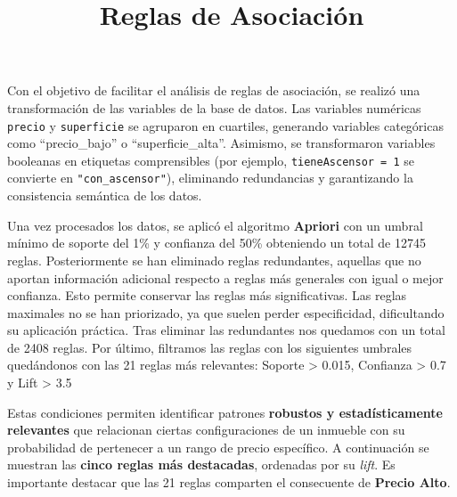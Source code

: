 \documentclass[
]{article}
\title{Reglas de Asociación}
\author{}
\date{\vspace{-2.5em}}
\begin{document}
\maketitle

Con el objetivo de facilitar el análisis de reglas de asociación, se
realizó una transformación de las variables de la base de datos. Las
variables numéricas \texttt{precio} y \texttt{superficie} se agruparon
en cuartiles, generando variables categóricas como ``precio\_bajo'' o
``superficie\_alta''. Asimismo, se transformaron variables booleanas en
etiquetas comprensibles (por ejemplo, \texttt{tieneAscensor\ =\ 1} se
convierte en \texttt{"con\_ascensor"}), eliminando redundancias y
garantizando la consistencia semántica de los datos.

Una vez procesados los datos, se aplicó el algoritmo \textbf{Apriori}
con un umbral mínimo de soporte del 1\% y confianza del 50\% obteniendo
un total de 12745 reglas. Posteriormente se han eliminado reglas
redundantes, aquellas que no aportan información adicional respecto a
reglas más generales con igual o mejor confianza. Esto permite conservar
las reglas más significativas. Las reglas maximales no se han
priorizado, ya que suelen perder especificidad, dificultando su
aplicación práctica. Tras eliminar las redundantes nos quedamos con un
total de 2408 reglas. Por último, filtramos las reglas con los
siguientes umbrales quedándonos con las 21 reglas más relevantes:
Soporte \textgreater{} 0.015, Confianza \textgreater{} 0.7 y Lift
\textgreater{} 3.5

Estas condiciones permiten identificar patrones \textbf{robustos y
estadísticamente relevantes} que relacionan ciertas configuraciones de
un inmueble con su probabilidad de pertenecer a un rango de precio
específico. A continuación se muestran las \textbf{cinco reglas más
destacadas}, ordenadas por su \emph{lift}. Es importante destacar que
las 21 reglas comparten el consecuente de \textbf{Precio Alto}.
\end{document}

